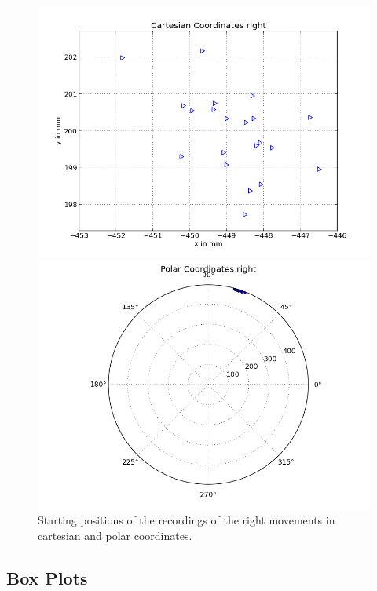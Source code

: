 \documentclass{scrartcl}
\begin{document}
\begin{figure}[H]
\centering
\begin{minipage}{.5\textwidth}
  \centering
  \includegraphics[width=.8\linewidth]{img/right_s.png}
\end{minipage}%
\begin{minipage}{.5\textwidth}
  \centering
  \includegraphics[width=.8\linewidth]{img/right_pc_s.png}
\end{minipage}
\caption{Starting positions of the recordings of the right movements in cartesian and polar coordinates.}
\label{fig:right}
\end{figure}


\subsection{Box Plots}
\end{document}

